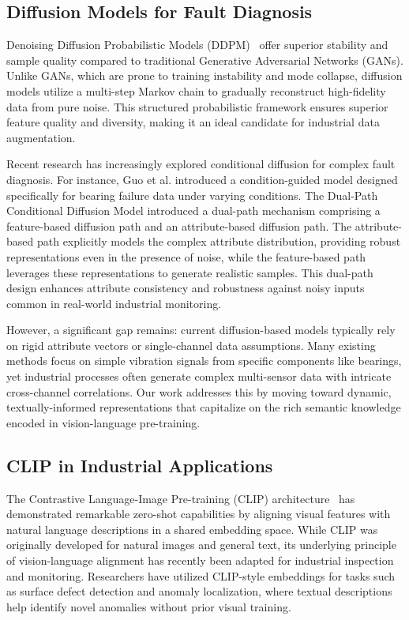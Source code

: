 \documentclass[journal,12pt,onecolumn]{IEEEtran}
\begin{document}
\subsection{Diffusion Models for Fault Diagnosis}
Denoising Diffusion Probabilistic Models (DDPM)~\cite{ho2020denoising} offer superior stability and sample quality compared to traditional Generative Adversarial Networks (GANs). Unlike GANs, which are prone to training instability and mode collapse, diffusion models utilize a multi-step Markov chain to gradually reconstruct high-fidelity data from pure noise. This structured probabilistic framework ensures superior feature quality and diversity, making it an ideal candidate for industrial data augmentation.

Recent research has increasingly explored conditional diffusion for complex fault diagnosis. For instance, Guo et al. introduced a condition-guided model designed specifically for bearing failure data under varying conditions. The Dual-Path Conditional Diffusion Model introduced a dual-path mechanism comprising a feature-based diffusion path and an attribute-based diffusion path. The attribute-based path explicitly models the complex attribute distribution, providing robust representations even in the presence of noise, while the feature-based path leverages these representations to generate realistic samples. This dual-path design enhances attribute consistency and robustness against noisy inputs common in real-world industrial monitoring.

However, a significant gap remains: current diffusion-based models typically rely on rigid attribute vectors or single-channel data assumptions. Many existing methods focus on simple vibration signals from specific components like bearings, yet industrial processes often generate complex multi-sensor data with intricate cross-channel correlations. Our work addresses this by moving toward dynamic, textually-informed representations that capitalize on the rich semantic knowledge encoded in vision-language pre-training.

\subsection{CLIP in Industrial Applications}
The Contrastive Language-Image Pre-training (CLIP) architecture~\cite{radford2021learning} has demonstrated remarkable zero-shot capabilities by aligning visual features with natural language descriptions in a shared embedding space. While CLIP was originally developed for natural images and general text, its underlying principle of vision-language alignment has recently been adapted for industrial inspection and monitoring. Researchers have utilized CLIP-style embeddings for tasks such as surface defect detection and anomaly localization, where textual descriptions help identify novel anomalies without prior visual training.
\end{document}
